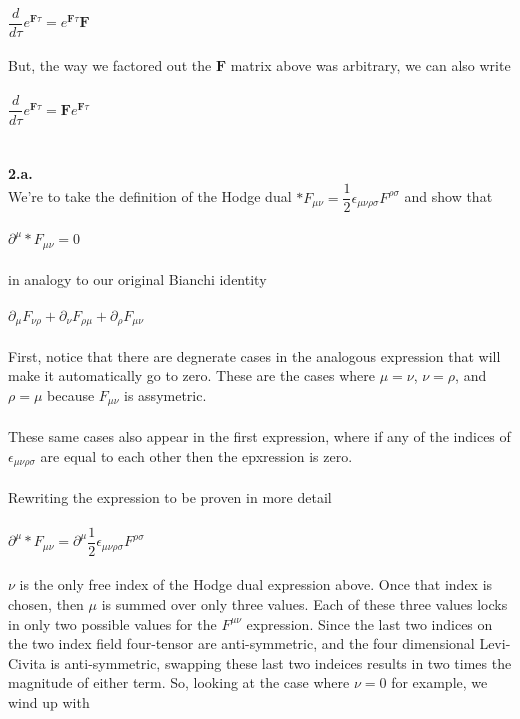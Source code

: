 \documentclass[prb,preprint]
{revtex4-1}
\newcommand{\PRLsep}{\noindent\makebox[\linewidth]{\resizebox{0.8888\linewidth}{2pt}{$\bullet$}}\bigskip}
\begin{document}
\\
$\dfrac{d}{d\tau} e^{\boldsymbol{F}\tau} = e^{\boldsymbol{F}\tau}\boldsymbol{F}$ 
\\
\\
But, the way we factored out the $\boldsymbol{F}$ matrix above was arbitrary, we can also write
\\
\\
$\dfrac{d}{d\tau} e^{\boldsymbol{F}\tau} = \boldsymbol{F}e^{\boldsymbol{F}\tau}$ 
\\
\\
\PRLsep
\\
\newpage
\textbf{2.a.}
\\
We're to take the definition of the Hodge dual
$*F_{\mu\nu} = \dfrac{1}{2}\epsilon_{\mu\nu\rho\sigma}F^{\rho\sigma}$ and show that
\\
\\
$\partial^\mu *F_{\mu\nu} = 0$
\\
\\
in analogy to our original Bianchi identity
\\
\\
$\partial_\mu F_{\nu\rho} + \partial_\nu F_{\rho\mu} + \partial_\rho F_{\mu\nu}$
\\
\\
First, notice that there are degnerate cases in the analogous expression that will make it automatically go to zero.  These are the cases where $\mu = \nu$, $\nu = \rho$, and $\rho = \mu$ because $F_{\mu\nu}$ is assymetric.
\\
\\
These same cases also appear in the first expression, where if any of the indices of $\epsilon_{\mu\nu\rho\sigma}$ are equal to each other then the epxression is zero.
\\
\\
Rewriting the expression to be proven in more detail
\\
\\
$\partial^\mu*F_{\mu\nu} = \partial^\mu\dfrac{1}{2}\epsilon_{\mu\nu\rho\sigma}F^{\rho\sigma}$
\\
\\
$\nu$ is the only free index of the Hodge dual expression above.  Once that index is chosen, then $\mu$ is summed over only three values.  Each of these three values locks in only two possible values for the $F^{\mu\nu}$ expression.  Since the last two indices on the two index field four-tensor are anti-symmetric, and the four dimensional Levi-Civita is anti-symmetric, swapping these last two indeices results in two times the magnitude of either term.  So, looking at the case where $\nu = 0$ for example, we wind up with 
\end{document}
